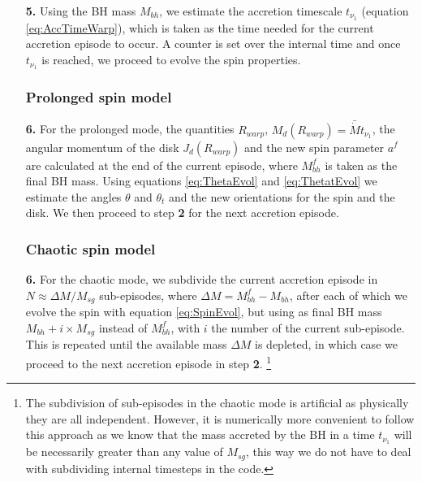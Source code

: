 \documentclass[a4,useAMS,usenatbib,usegraphicx,12pt]{article}
\begin{document}
\begin{itemize}
 \item[\textbf{5.}] Using the BH mass $M_{bh}$, we estimate the accretion timescale $t_{\nu_1}$ 
 (equation \ref{eq:AccTimeWarp}), which is taken as the time needed for the current accretion episode
 to occur. A counter is set over the internal time and once $t_{\nu_1}$ is reached, we proceed 
 to evolve the spin properties.

 \subsubsection*{Prolonged spin model}
 
 \item[\textbf{6.}] For the prolonged mode, the quantities $R_{warp}$, $M_d(R_{warp}) = \bar{\dot{M}}
 t_{\nu_1}$, the angular momentum of the disk $J_d(R_{warp})$ and the new spin parameter $a^f$ are 
 calculated at the end of the current episode, where $M_{bh}^f$ is taken as the final BH mass. Using 
 equations \ref{eq:ThetaEvol} and \ref{eq:ThetatEvol} we estimate the angles $\theta$ and $\theta_t$ 
 and the new orientations for the spin and the disk. We then proceed to step \textbf{2} for the next 
 accretion episode.

 \subsubsection*{Chaotic spin model}
 
 \item[\textbf{6.}] For the chaotic mode, we subdivide the current accretion episode in $N \approx 
 \Delta M / M_{sg} $ sub-episodes, where $\Delta M = M_{bh}^f - M_{bh}$, after each of which we 
 evolve the spin with equation \ref{eq:SpinEvol}, but using as final BH mass $M_{bh} + i\times M_{sg}$ 
 instead of $M_{bh}^f$, with $i$ the number of the current sub-episode. This is repeated until the 
 available mass $\Delta M$ is depleted, in which case we proceed to the next accretion episode in 
 step \textbf{2}. \footnote{ The subdivision of sub-episodes in the chaotic mode is artificial as 
 physically they are all independent. However, it is numerically more convenient to follow this 
 approach as we know that the mass accreted by the BH in a time $t_{\nu_1}$ will be necessarily 
 greater than any value of $M_{sg}$, this way we do not have to deal with subdividing internal 
 timesteps in the code.}


\end{itemize}
\end{document}
